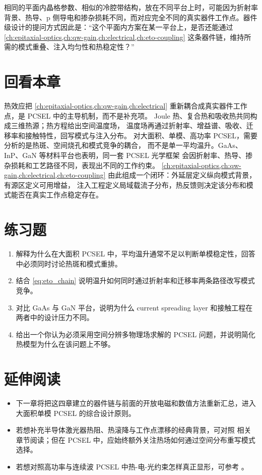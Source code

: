 相同的平面内晶格参数、相似的冷腔带结构，放在不同平台上时，可能因为折射率背景、热导、p 侧导电和掺杂损耗不同，而对应完全不同的真实器件工作点。器件级设计的提问方式因此是：“这个平面内方案在某一平台上，是否还能通过 \cref{ch:epitaxial-optics,ch:qw-gain,ch:electrical,ch:eto-coupling} 这条器件链，维持所需的模式重叠、注入均匀性和热稳定性？”

\section*{回看本章}
热效应把 \cref{ch:epitaxial-optics,ch:qw-gain,ch:electrical}
重新耦合成真实器件工作点，是 PCSEL 中的主导机制，而不是补充项。
Joule 热、复合热和吸收热共同构成三维热源；热方程给出空间温度场，
温度场再通过折射率、增益谱、吸收、迁移率和接触特性，回写模式与注入分布。
对大面积、单模、高功率 PCSEL，需要分析的是热斑、空间烧孔和模式竞争的耦合，
而不是单一平均温升。GaAs、InP、GaN 等材料平台也表明，同一套 PCSEL 光学框架
会因折射率、热导、掺杂损耗和工艺路径不同，表现出不同的工作约束。
\cref{ch:epitaxial-optics,ch:qw-gain,ch:electrical,ch:eto-coupling}
由此组成一个闭环：外延层定义纵向模式背景，有源区定义可用增益，
注入工程定义局域载流子分布，热反馈则决定该分布和模式能否在真实工作点稳定存在。

\section*{练习题}
\begin{enumerate}
  \item \basicq 解释为什么在大面积 PCSEL 中，平均温升通常不足以判断单模稳定性，回答中必须同时讨论热斑和模式重排。

  \item \basicq 结合 \cref{eq:eto_chain} 说明温升如何同时通过折射率和迁移率两条路径改写模式竞争。

  \item \midq 对比 GaAs 与 GaN 平台，说明为什么 current spreading layer 和接触工程在两者中的设计压力不同。

  \item \hardq 给出一个你认为必须采用空间分辨多物理场求解的 PCSEL 问题，并说明简化热模型为什么在该问题上不够。
\end{enumerate}

\section*{延伸阅读}
\begin{itemize}
  \item 下一章将把这四章建立的器件链与前面的开放电磁和数值方法重新汇总，进入大面积单模 PCSEL 的综合设计原则。

  \item 若想补充半导体激光器热阻、热滚降与工作点漂移的经典背景，可对照 \cite{coldren2012} 相关章节阅读；但在 PCSEL 中，应始终额外关注热场如何通过空间分布重写模式选择。

  \item 若想对照高功率与连续波 PCSEL 中热-电-光约束怎样真正显形，可参考 \cite{hirose2014,yoshida2019,yoshida2023,wang2024}。
\end{itemize}
